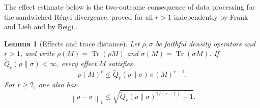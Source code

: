 \documentclass[11pt]{amsart}
\numberwithin{equation}{section}
\newtheorem{lemma}[theorem]{Lemma}
\theoremstyle{definition}
\newcommand{\Qtil}{\widetilde Q}
\newcommand{\Tr}{\operatorname{Tr}}
\newcommand{\norm}[1]{\left\|#1\right\|}
\begin{document}
The effect estimate below is the two-outcome consequence of data
processing for the sandwiched Rényi divergence, proved for all \(r>1\)
independently by Frank and Lieb \cite{FL13} and by Beigi
\cite{Beigi13}.

\begin{lemma}[Effects and trace distance]\label{lem:renyi-consequences}
Let \(\rho,\sigma\) be faithful density operators and \(r>1\), and
write \(\rho(M)=\Tr(\rho M)\) and \(\sigma(M)=\Tr(\sigma M)\). If
\(\Qtil_r(\rho\|\sigma)<\infty\), every effect \(M\)
satisfies
\begin{equation}
 \rho(M)^r\le
 \Qtil_r(\rho\|\sigma)\,\sigma(M)^{r-1}.
 \label{eq:effect-renyi}
\end{equation}
For \(r\ge2\), one also has
\begin{equation}
 \norm{\rho-\sigma}_1
 \le\sqrt{\Qtil_r(\rho\|\sigma)^{1/(r-1)}-1}.
 \label{eq:trace-distance}
\end{equation}
\end{lemma}
\end{document}
